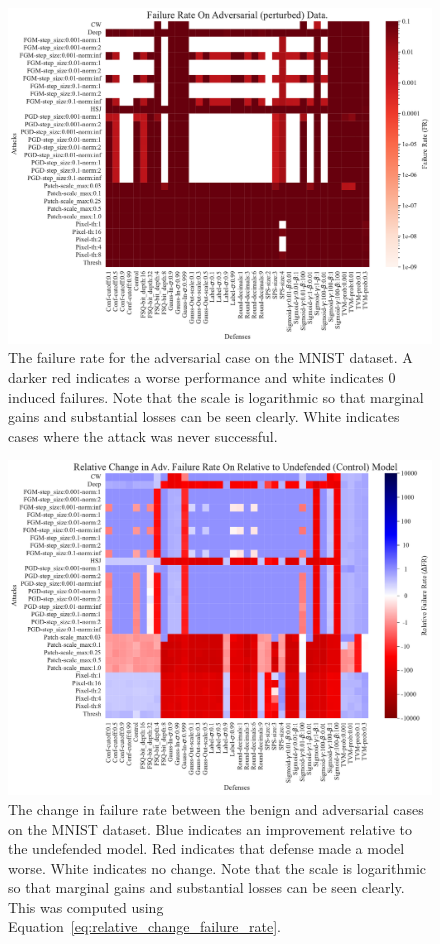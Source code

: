 \documentclass[journal]{IEEEtran}
\begin{document}
\begin{figure}[!hptb]
    {\centering
    \includegraphics[trim={0 0.85em 0 0.35em},clip,height=0.6\textwidth]{Fig21.pdf}
    \vspace{-0.5em}
    \caption{The failure rate for the adversarial case on the MNIST dataset. A darker red indicates a worse performance and white indicates 0 induced failures. Note that the scale is logarithmic so that marginal gains and substantial losses can be seen clearly. White indicates cases where the attack was never successful.}
    \label{fig:mnist_rate_grid}
    } %
\end{figure}

\begin{figure}[!hptb]
    {\centering
    \includegraphics[trim={0 0.85em 0 0.35em},clip,height=0.6\textwidth]{Fig22.pdf}
    \vspace{-0.5em}
    \caption{The change in failure rate between the benign and adversarial cases on the MNIST dataset. Blue indicates an improvement relative to the undefended model. Red indicates that defense made a model worse. White indicates no change. Note that the scale is logarithmic so that marginal gains and substantial losses can be seen clearly. This was computed using Equation~\ref{eq:relative_change_failure_rate}.}
    \label{fig:mnist_change_grid}
    } %
\end{figure}
\end{document}
